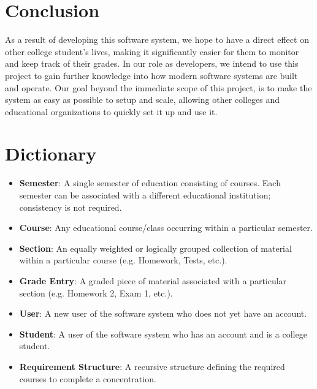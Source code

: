 \documentclass[12pt]{article}
\newcommand{\dictitem}[1]{\item \textbf{#1}:}
\newenvironment{dict}
{
    \begin{itemize}
}
{
    \end{itemize}
}
\begin{document}
\clearpage


\section{Conclusion}
As a result of developing this software system, we hope to have a direct effect on other college
student's lives, making it significantly easier for them to monitor and keep track of their grades.
In our role as developers, we intend to use this project to gain further knowledge into how modern
software systems are built and operate. Our goal beyond the immediate scope of this project, is to
make the system as easy as possible to setup and scale, allowing other colleges and educational
organizations to quickly set it up and use it.

\section{Dictionary}
\begin{dict}
    \dictitem{Semester} A single semester of education consisting of courses. Each semester can
    be associated with a different educational institution; consistency is not required.
    \dictitem{Course} Any educational course/class occurring within a particular semester.
    \dictitem{Section} An equally weighted or logically grouped collection of material within a
    particular course (e.g. Homework, Tests, etc.).
    \dictitem{Grade Entry} A graded piece of material associated with a particular section 
    (e.g. Homework 2, Exam 1, etc.).
    \dictitem{User} A new user of the software system who does not yet have an account.
    \dictitem{Student} A user of the software system who has an account and is a college student.
    \dictitem{Requirement Structure} A recursive structure defining the required courses to complete
    a concentration.
\end{dict}
\end{document}

